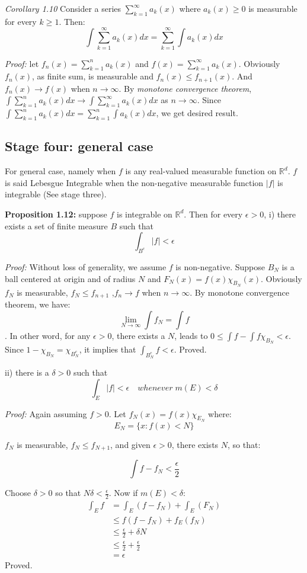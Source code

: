 \documentclass[
]{article}
\begin{document}
\textit{Corollary 1.10} Consider a series \(\sum_{k=1}^{\infty}a_k(x)\) where \(a_k(x) \geq 0\) is measurable for every \(k \geq 1\). Then:
\[\int \sum_{k=1}^{\infty}a_k(x)dx=\sum_{k=1}^{\infty}\int a_k(x)dx\]

\textit{Proof:} let \(f_n(x)=\sum_{k=1}^{n}a_k(x)\) and \(f(x)=\sum_{k=1}^{\infty}a_k(x)\). Obviously \(f_n(x)\), as finite sum, is measurable
and \(f_n(x)\leq f_{n+1}(x)\). And \(f_n(x)\to f(x)\) when  \(n\to\infty\). By \textit{monotone convergence theorem},
\(\int \sum_{k=1}^na_k(x)dx\to \int \sum_{k=1}^{\infty}a_k(x)dx\) as \(n\to\infty\). Since \(\int \sum_{k=1}^na_k(x)dx=\sum_{k=1}^n\int a_k(x)dx\),
we get desired result.

\subsection{Stage four: general case}
For general case, namely when \(f\) is any real-valued measurable function on \(\mathbb{R}^d\).
\(f\) is said Lebesgue Integrable when the non-negative measurable function \(|f|\) is integrable
(See stage three).

\textbf{Proposition 1.12:} suppose \(f\) is integrable on \(\mathbb{R}^d\). Then for every \(\epsilon > 0\),
i) there exists a set of finite measure \(B\) such that
\[\int_{B^c}|f|<\epsilon\]

\textit{Proof:}
Without loss of generality, we assume \(f\) is non-negative. Suppose \(B_N\) is a ball centered at origin and of radius 
\(N\) and \(F_N(x) = f(x)\chi_{B_N}(x)\). Obviously \(f_N\) is measurable, \(f_N \leq f_{n+1}\)
,\(f_n \to f\) when \(n \to \infty\). By monotone convergence theorem, we have:
\[\lim_{N\to\infty}\int f_N=\int f\]. In other word, for any \(\epsilon > 0\), there exists a \(N\),
leads to \(0 \leq \int f - \int f\chi_{B_N} < \epsilon\). Since \(1-\chi_{B_N}=\chi_{B_N^c}\), it implies
that \(\int_{B_N^c}f < \epsilon\). Proved.

ii) there is a \(\delta > 0 \) such that
\[\int_E|f|<\epsilon\quad whenever\; m(E)<\delta\] 

\textit{Proof:}
Again assuming \(f > 0 \). Let \(f_N(x)=f(x)\chi_{E_N}\) where:
\[E_N=\{x: f(x)<N\}\]

\(f_N\) is measurable, \(f_N \leq f_{N+1}\), and given \(\epsilon>0\), there exists \(N\), so that:

\[\int f - f_N < \frac{\epsilon}{2}\]

Choose \(\delta > 0\) so that \(N\delta < \frac{\epsilon}{2}\). Now if \(m(E)<\delta\):
\[
  \begin{split}
  \int_E f &= \int_E(f-f_N)+\int_E(F_N)\\
  &\leq f (f - f_N) + f_E(f_N)\\
  &\leq \frac{\epsilon}{2}+\delta N\\
  &\leq \frac{\epsilon}{2}+\frac{\epsilon}{2}\\
  &=\epsilon
  \end{split}
  \]
Proved.
\end{document}
